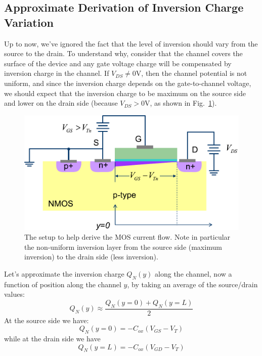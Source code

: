 \subsection{Approximate Derivation of Inversion Charge Variation}
Up to now, we've ignored the fact that the level of inversion should vary from the source to the drain.  To understand why, consider that the channel covers the surface of the device and any gate voltage charge will be compensated by inversion charge in the channel.  If $V_{DS} \ne 0$V, then the channel potential is not uniform, and since the inversion charge depends on the gate-to-channel voltage, we should expect that the inversion charge to be maximum on the source side and lower on the drain side (because $V_{DS} > 0$V, as shown in Fig.~\ref{fig:mos_current_derive}).
\begin{figure}[tb]
\centering
\includegraphics[width=.75\columnwidth]{mos_current_derive}
\caption{The setup to help derive the MOS current flow.  Note in particular the non-uniform inversion layer from the source side (maximum inversion) to the drain side (less inversion).}
\label{fig:mos_current_derive}
\end{figure}
Let's approximate the  inversion charge $Q_N(y)$ along the channel, now a function of position along the channel $y$, by taking an average of the source/drain values:
    \begin{equation} 
        {Q_N}(y) \approx \frac{{Q_N}(y = 0) + {Q_N}(y = L)}{2} 
    \end{equation}
At the source side we have:
    \begin{equation} 
        {Q_N}(y = 0) =  - {C_{ox}}({V_{GS}} - {V_T}) 
    \end{equation}
while at the drain side we have
    \begin{equation} 
        {Q_N}(y = L) =  - {C_{ox}}({V_{GD}} - {V_T}) 
    \end{equation}
